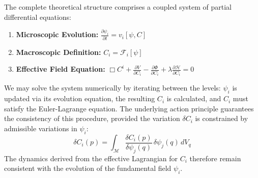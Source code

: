 The complete theoretical structure comprises a coupled system of partial differential equations:
\begin{enumerate}
    \item \textbf{Microscopic Evolution:} \(\displaystyle \frac{\partial \psi_i}{\partial t} = v_i[\psi, C]\)
    \item \textbf{Macroscopic Definition:} \(C_i = \mathcal{F}_i[\psi]\)
    \item \textbf{Effective Field Equation:} \(\Box C^i + \frac{\partial V}{\partial C_i} - \frac{\partial \Phi}{\partial C_i} + \lambda \frac{\partial \mathcal{H}}{\partial C_i} = 0\)
\end{enumerate}
We may solve the system numerically by iterating between the levels: \(\psi_i\) is updated via its evolution equation, the resulting \(C_i\) is calculated, and \(C_i\) must satisfy the Euler-Lagrange equation. The underlying action principle guarantees the consistency of this procedure, provided the variation \(\delta C_i\) is constrained by admissible variations in \(\psi_i\):
\begin{equation}
\delta C_i(p) = \int_{\mathcal{M}} \frac{\delta C_i(p)}{\delta \psi_j(q)} \, \delta \psi_j(q) \, dV_q
\end{equation}
The dynamics derived from the effective Lagrangian for \(C_i\) therefore remain consistent with the evolution of the fundamental field \(\psi_i\).